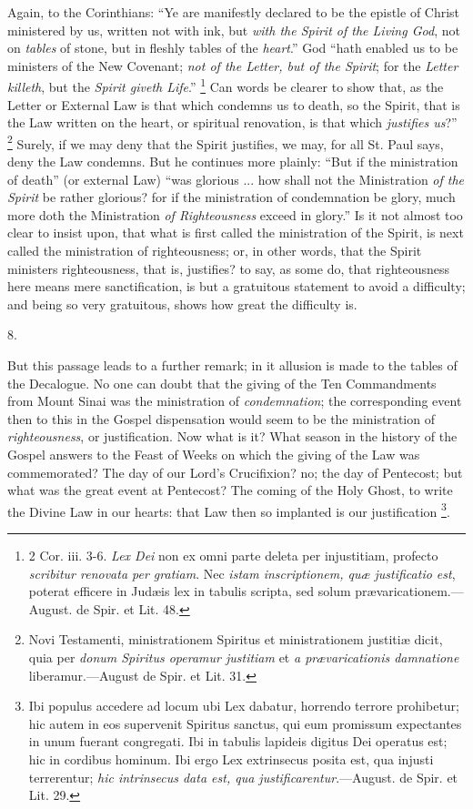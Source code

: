 Again, to the Corinthians: ``Ye are manifestly declared to be
the epistle of Christ ministered by us, written not with ink, but \emph{with
the Spirit of the Living God}, not on \emph{tables} of stone, but
in fleshly tables of the \emph{heart}.'' God ``hath enabled us
to be ministers of the New Covenant; \emph{not of the Letter, but of the
Spirit}; for the \emph{Letter killeth}, but the \emph{Spirit giveth
Life}.'' \footnote{2 Cor. iii.
3-6. \emph{Lex Dei} non ex omni parte deleta per injustitiam, profecto
\emph{scribitur renovata per gratiam}. Nec \emph{istam inscriptionem,
quæ justificatio est}, poterat efficere in Judæis lex in tabulis
scripta, sed solum prævaricationem.—August. de Spir. et Lit. 48.} Can words
be clearer to show that, as the Letter or External Law is that which
condemns us to death, so the Spirit, that is the Law written on the
heart, or spiritual renovation, is that which \emph{justifies us}?''
\footnote{Novi Testamenti,
ministrationem Spiritus et ministrationem justitiæ dicit, quia per \emph{donum
Spiritus operamur justitiam} et \emph{a prævaricationis damnatione}
liberamur.—August de Spir. et Lit. 31.} Surely, if we may deny
that the Spirit justifies, we may, for all St. Paul says, deny the Law
condemns. But he continues more plainly: ``But if the ministration
of death'' (or external Law) ``was glorious ... how shall not
the Ministration \emph{of the Spirit} be rather glorious? for if the
ministration of condemnation be glory, much more doth the
Ministration \emph{of Righteousness} exceed in glory.'' Is it not
almost too clear to insist upon, that what is first called the
ministration of the Spirit, is next called the ministration of
righteousness; or, in other words, that the Spirit ministers
righteousness, that is, justifies? to say, as some do, that
righteousness here means mere sanctification, is but a gratuitous
statement to avoid a difficulty; and being so very gratuitous, shows
how great the difficulty is.

8.

But this passage leads to a further remark; in it allusion is made
to the tables of the Decalogue. No one can doubt that the giving of
the Ten Commandments from Mount Sinai was the ministration of \emph{condemnation};
the corresponding event then to this in the Gospel dispensation would
seem to be the ministration of \emph{righteousness}, or justification.
Now what is it? What season in the history of the Gospel answers to
the Feast of Weeks on which the giving of the Law was commemorated?
The day of our Lord's Crucifixion? no; the day of Pentecost; but what
was the great event at Pentecost? The coming of the Holy Ghost, to
write the Divine Law in our hearts: that Law then so implanted is our
justification \footnote{Ibi populus
accedere ad locum ubi Lex dabatur, horrendo terrore prohibetur; hic
autem in eos supervenit Spiritus sanctus, qui eum promissum
expectantes in unum fuerant congregati. Ibi in tabulis lapideis
digitus Dei operatus est; hic in cordibus hominum. Ibi ergo Lex
extrinsecus posita est, qua injusti terrerentur; \emph{hic intrinsecus
data est, qua justificarentur}.—August. de Spir. et Lit. 29.}.


